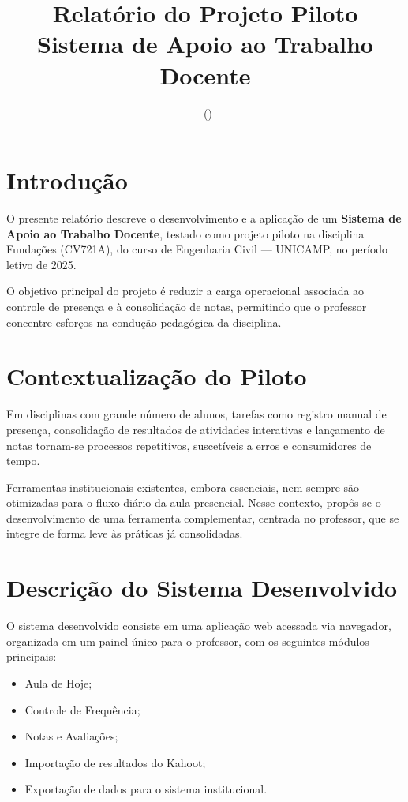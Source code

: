 \documentclass[12pt,a4paper]{article}
\title{\textbf{Relatório do Projeto Piloto}\\
Sistema de Apoio ao Trabalho Docente\\
\Disciplina}
\author{}
\date{\DataRelatorio\ (\VersaoRelatorio)}
\newcommand{\Disciplina}{Fundações (CV721A)}
\newcommand{\Curso}{Engenharia Civil — UNICAMP}
\newcommand{\Periodo}{2025}
\begin{document}
\maketitle

\section{Introdução}

O presente relatório descreve o desenvolvimento e a aplicação de um \textbf{Sistema de Apoio ao Trabalho Docente}, testado como projeto piloto na disciplina \Disciplina{}, do curso de \Curso{}, no período letivo de \Periodo{}.

O objetivo principal do projeto é reduzir a carga operacional associada ao controle de presença e à consolidação de notas, permitindo que o professor concentre esforços na condução pedagógica da disciplina.

\section{Contextualização do Piloto}

Em disciplinas com grande número de alunos, tarefas como registro manual de presença, consolidação de resultados de atividades interativas e lançamento de notas tornam-se processos repetitivos, suscetíveis a erros e consumidores de tempo.

Ferramentas institucionais existentes, embora essenciais, nem sempre são otimizadas para o fluxo diário da aula presencial. Nesse contexto, propôs-se o desenvolvimento de uma ferramenta complementar, centrada no professor, que se integre de forma leve às práticas já consolidadas.

\section{Descrição do Sistema Desenvolvido}

O sistema desenvolvido consiste em uma aplicação web acessada via navegador, organizada em um painel único para o professor, com os seguintes módulos principais:

\begin{itemize}[noitemsep]
  \item Aula de Hoje;
  \item Controle de Frequência;
  \item Notas e Avaliações;
  \item Importação de resultados do Kahoot;
  \item Exportação de dados para o sistema institucional.
\end{itemize}
\end{document}
